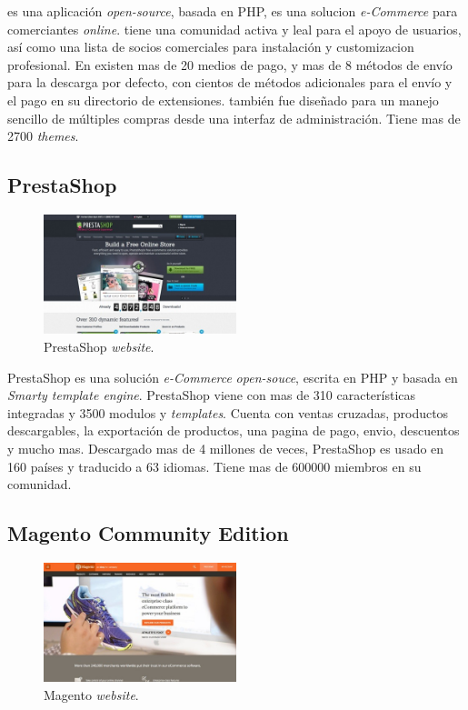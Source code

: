 \nameOpenCart es una aplicación \textit{open-source}, basada en PHP, es una solucion \textit{e-Commerce} para comerciantes \textit{online}. \nameOpenCart tiene una comunidad activa y leal para el apoyo de usuarios, así como una lista de socios comerciales para instalación y customizacion profesional. En \nameOpenCart existen mas de 20 medios de pago, y mas de 8 métodos de envío para la descarga por defecto, con cientos de métodos adicionales para el envío y el pago en su directorio de extensiones. \nameOpenCart también fue diseñado para un manejo sencillo de múltiples compras desde una interfaz de administración. Tiene mas de 2700 \textit{themes}.

\newcommand{\namePrestaShop}{PrestaShop }
\subsection{\namePrestaShop}

\begin{figure}[h!]
	\centering
	\includegraphics[width=0.5\textwidth]{figuras/cap1/PrestaShopWebsite.jpg}
	\caption{\namePrestaShop \textit{website}\cite{online_PrestaShop}.}
\end{figure}

\namePrestaShop es una solución \textit{e-Commerce} \textit{open-souce}, escrita en PHP y basada en \textit{Smarty template engine}. \namePrestaShop viene con mas de 310 características integradas y 3500 modulos y \textit{templates}. Cuenta con ventas cruzadas, productos descargables, la exportación de productos, una pagina de pago, envio, descuentos y mucho mas. Descargado mas de 4 millones de veces, \namePrestaShop es usado en 160 países y traducido a 63 idiomas. Tiene mas de 600000 miembros en su comunidad.

\newcommand{\nameMagento}{Magento }
\subsection{\nameMagento Community Edition}

\begin{figure}[h!]
	\centering
	\includegraphics[width=0.5\textwidth]{figuras/cap1/MagentoWebsite.jpg}
	\caption{\nameMagento \textit{website}\cite{online_Magento}.}
\end{figure}

